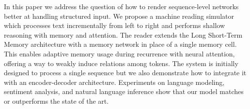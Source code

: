 In this paper we address the question of how to render sequence-level networks better at handling structured input. We propose a machine reading simulator which processes text incrementally from left to right and performs shallow reasoning with memory and attention. The reader extends the Long Short-Term Memory architecture with a memory network in place of a single memory cell. This enables adaptive memory usage during recurrence with neural attention, offering a way to weakly induce relations among tokens.              The system is initially designed to process a single sequence but we also demonstrate how to integrate it with an encoder-decoder architecture.  Experiments on language modeling, sentiment analysis, and natural language inference show that our model matches or outperforms the state of the art.
